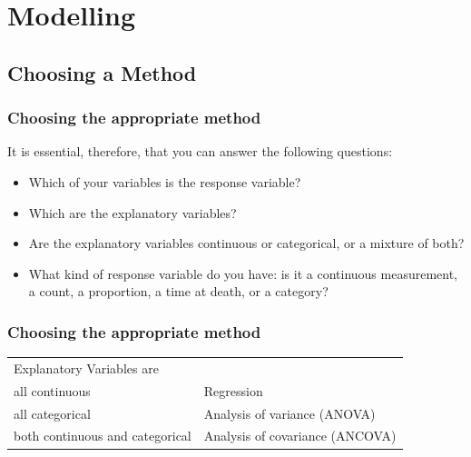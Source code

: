 \section{Modelling}
\subsection{Choosing a Method}
\begin{frame}\frametitle{Choosing the appropriate method}
It is essential, therefore, that you can answer the following questions:
\begin{itemize}
\item Which of your variables is the response variable?
\item Which are the explanatory variables?
\item Are the explanatory variables continuous or categorical, or a mixture of both?
\item What kind of response variable do you have: is it a continuous measurement, a count, a proportion, a time at death, or a category?
\end{itemize}
\end{frame}

\begin{frame}\frametitle{Choosing the appropriate method}
\begin{center}\footnotesize
  \begin{tabular}{@{} >{\ttfamily}l l} 
    \rowcolor{gray!40}
Explanatory Variables are & \\
all  continuous                  & Regression                     \\ 
all categorical & Analysis of variance (ANOVA)   \\
both continuous and categorical & Analysis of covariance (ANCOVA)\\
  \end{tabular}
\end{center}
\end{frame}

